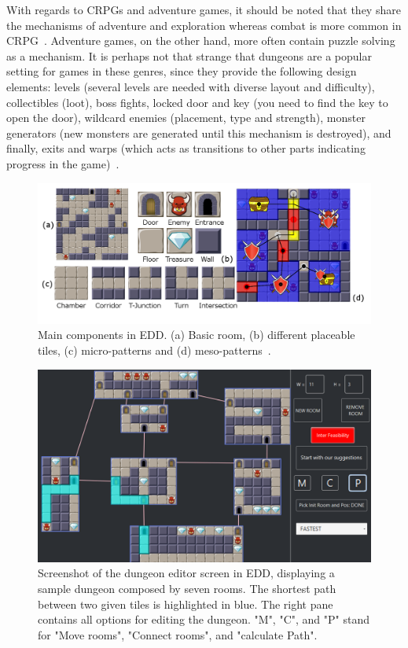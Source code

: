 With regards to CRPGs and adventure games, it should be noted that they share the mechanisms of adventure and exploration whereas combat is more common in CRPG~. Adventure games, on the other hand, more often contain puzzle solving as a mechanism. It is perhaps not that strange that dungeons are a popular setting for games in these genres, since they provide the following design elements: levels (several levels are needed with diverse layout and difficulty), collectibles (loot), boss fights, locked door and key (you need to find the key to open the door), wildcard enemies (placement, type and strength), monster generators (new monsters are generated until this mechanism is destroyed), and finally, exits and warps (which acts as transitions to other parts indicating progress in the game)~. 

\begin{figure}[t]
\centerline{\includegraphics[width=\textwidth]{figure1.png}}
\caption{Main components in EDD. (a) Basic room, (b) different placeable tiles, (c) micro-patterns and (d) meso-patterns~\protect{}.}
\label{figs:basecomponents}
\end{figure}

\begin{figure}[t]
\centerline{\includegraphics[width=\textwidth]{figure2.png}}
\caption{Screenshot of the dungeon editor screen in EDD, displaying a sample dungeon composed by seven rooms. The shortest path between two given tiles is highlighted in blue. The right pane contains all options for editing the dungeon. "M", "C", and "P" stand for "Move rooms", "Connect rooms", and "calculate Path".}
\label{figs:dungeonscreen}
\end{figure}

